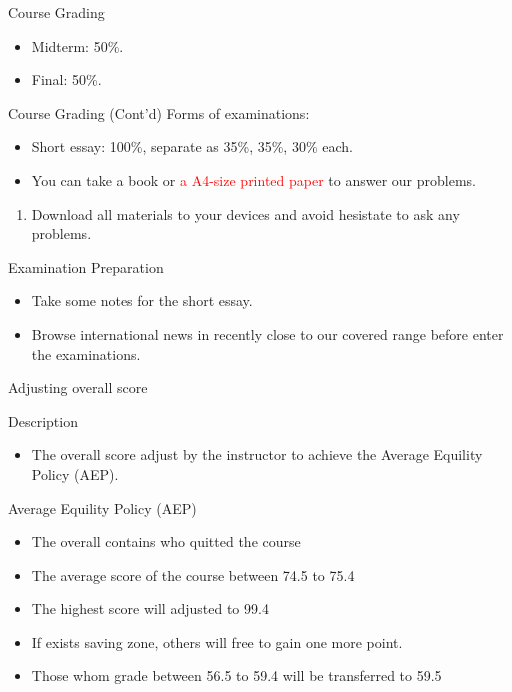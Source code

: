 \documentclass{beamer}
\begin{document}
\begin{frame}{Course Grading}
\begin{itemize}
\item Midterm: 50\%.
\item Final: 50\%.
\end{itemize}
\end{frame}
\begin{frame}{Course Grading (Cont'd)}
Forms of examinations:
\begin{itemize}
\item Short essay: 100\%, separate as 35\%, 35\%, 30\% each.
\item You can take a book or \textcolor{red}{a A4-size printed paper} to answer our problems.
\end{itemize}
\begin{enumerate}
\item Download all materials to your devices and avoid hesistate to ask any problems.
\end{enumerate}
\end{frame}
\begin{frame}{Examination Preparation}
\begin{itemize}
\item Take some notes for the short essay.
\item Browse international news in recently close to our covered range before enter the examinations.
\end{itemize}
\end{frame}
\begin{frame}{Adjusting overall score}
\begin{block}{Description}
\begin{itemize}
\item The overall score adjust by the instructor to achieve the Average Equility Policy (AEP).
\end{itemize}
\end{block}
\begin{block}{Average Equility Policy (AEP)}
\begin{itemize}
\item The overall contains who quitted the course
\item The average score of the course between 74.5 to 75.4
\item The highest score will adjusted to 99.4
\item If exists saving zone, others will free to gain one more point.
\item Those whom grade between 56.5 to 59.4 will be transferred to 59.5
\end{itemize}
\end{block}
\end{frame}
\end{document}

